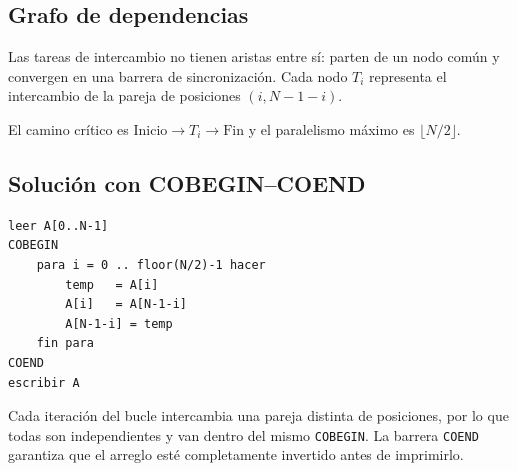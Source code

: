 \subsection*{Grafo de dependencias}
Las tareas de intercambio no tienen aristas entre s\'i: parten de un nodo
com\'un y convergen en una barrera de sincronizaci\'on. Cada nodo $T_i$
representa el intercambio de la pareja de posiciones $(i, N-1-i)$.

\begin{center}
\end{center}

El camino cr\'itico es $\text{Inicio} \rightarrow T_i \rightarrow \text{Fin}$ y
el paralelismo m\'aximo es $\lfloor N/2 \rfloor$.

\subsection*{Soluci\'on con COBEGIN--COEND}
\begin{lstlisting}
leer A[0..N-1]
COBEGIN
    para i = 0 .. floor(N/2)-1 hacer
        temp   = A[i]
        A[i]   = A[N-1-i]
        A[N-1-i] = temp
    fin para
COEND
escribir A
\end{lstlisting}

\noindent
Cada iteraci\'on del bucle intercambia una pareja distinta de posiciones, por lo
que todas son independientes y van dentro del mismo \texttt{COBEGIN}. La barrera
\texttt{COEND} garantiza que el arreglo est\'e completamente invertido antes de
imprimirlo.
